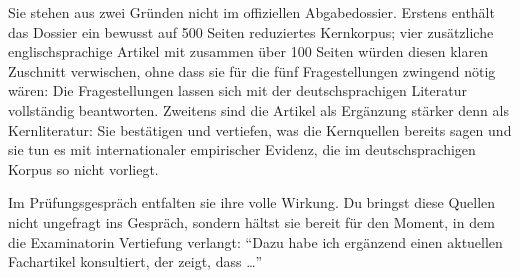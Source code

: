 \documentclass[ngerman, a4paper]{article}
\begin{document}
Sie stehen aus zwei Gründen nicht im offiziellen Abgabedossier. Erstens enthält das
Dossier ein bewusst auf 500 Seiten reduziertes Kernkorpus; vier zusätzliche
englischsprachige Artikel mit zusammen über 100 Seiten würden diesen klaren Zuschnitt
verwischen, ohne dass sie für die fünf Fragestellungen zwingend nötig wären: Die
Fragestellungen lassen sich mit der deutschsprachigen Literatur vollständig beantworten.
Zweitens sind die Artikel als Ergänzung stärker denn als Kernliteratur: Sie bestätigen und
vertiefen, was die Kernquellen bereits sagen und sie tun es mit internationaler empirischer
Evidenz, die im deutschsprachigen Korpus so nicht vorliegt.

Im Prüfungsgespräch entfalten sie ihre volle Wirkung. Du bringst diese Quellen nicht
ungefragt ins Gespräch, sondern hältst sie bereit für den Moment, in dem die Examinatorin
Vertiefung verlangt: \enquote{Dazu habe ich ergänzend einen aktuellen Fachartikel
konsultiert, der zeigt, dass \ldots}
\end{document}
